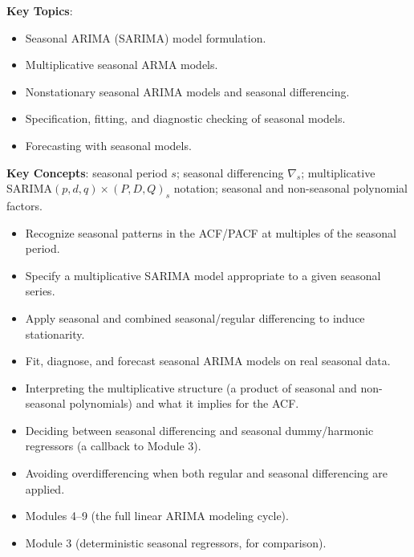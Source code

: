 \documentclass[11pt]{article}
\newcommand{\keytopics}{\textbf{\color{modblue}Key Topics}}
\newcommand{\keyconcepts}{\textbf{\color{modblue}Key Concepts}}
\begin{document}
\keytopics:
\begin{itemize}
  \item Seasonal ARIMA (SARIMA) model formulation.
  \item Multiplicative seasonal ARMA models.
  \item Nonstationary seasonal ARIMA models and seasonal differencing.
  \item Specification, fitting, and diagnostic checking of seasonal models.
  \item Forecasting with seasonal models.
\end{itemize}

\keyconcepts: seasonal period $s$; seasonal differencing $\nabla_s$; multiplicative SARIMA$(p,d,q)\times(P,D,Q)_s$ notation; seasonal and non-seasonal polynomial factors.

\begin{objectives}
\begin{itemize}
  \item Recognize seasonal patterns in the ACF/PACF at multiples of the seasonal period.
  \item Specify a multiplicative SARIMA model appropriate to a given seasonal series.
  \item Apply seasonal and combined seasonal/regular differencing to induce stationarity.
  \item Fit, diagnose, and forecast seasonal ARIMA models on real seasonal data.
\end{itemize}
\end{objectives}

\begin{difficult}
\begin{itemize}
  \item Interpreting the multiplicative structure (a product of seasonal and non-seasonal polynomials) and what it implies for the ACF.
  \item Deciding between seasonal differencing and seasonal dummy/harmonic regressors (a callback to Module 3).
  \item Avoiding overdifferencing when both regular and seasonal differencing are applied.
\end{itemize}
\end{difficult}

\begin{prereqs}
\begin{itemize}
  \item Modules 4--9 (the full linear ARIMA modeling cycle).
  \item Module 3 (deterministic seasonal regressors, for comparison).
\end{itemize}
\end{prereqs}
\end{document}
